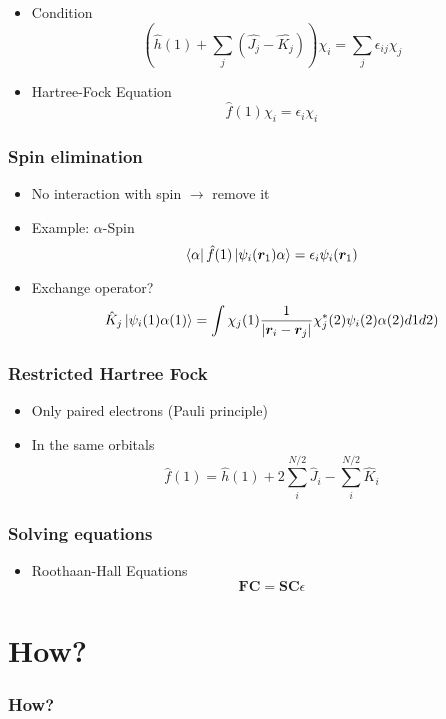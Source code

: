 \documentclass{beamer}
\begin{document}
\begin{frame}
    \begin{itemize}
        \item Condition
        \begin{equation*}
            \left(\hat{h}(1) + \sum_j(\hat{J_j} - \hat{K_j})\right)\chi_i = \sum_{j}\epsilon_{ij}\chi_j
        \end{equation*}
        \item Hartree-Fock Equation
        \begin{equation*}
            \hat{f}(1)\chi_i = \epsilon_i\chi_i
        \end{equation*}
    \end{itemize}
\end{frame}

\begin{frame}
    \frametitle{Spin elimination}
    \begin{itemize}
        \item No interaction with spin $\rightarrow$ remove it
        \item Example: $\alpha$-Spin
        \begin{equation*}
            \bra{\alpha}\hat{f}(1)\ket{\psi_i(\boldsymbol{r}_1)\alpha} = \epsilon_i\psi_i(\boldsymbol{r}_1)
        \end{equation*}
        \item Exchange operator?
        \begin{equation*}
            \hat{K}_j\ket{\psi_i(1)\alpha(1)} = \int\chi_j(1)\frac{1}{|\boldsymbol{r}_i - \boldsymbol{r}_j|}\chi_j^*(2)\psi_i(2)\alpha(2)d1d2)
        \end{equation*}
    \end{itemize}
\end{frame}

\begin{frame}
    \frametitle{Restricted Hartree Fock}
    \begin{itemize}
        \item Only paired electrons (Pauli principle)
        \item In the same orbitals
        \begin{equation*}
            \hat{f}(1) = \hat{h}(1) + 2\sum_i^{N/2}\hat{J}_i - \sum_i^{N/2}\hat{K}_i
        \end{equation*}
    \end{itemize}
\end{frame}

\begin{frame}
    \frametitle{Solving equations}
    \begin{itemize}
        \item Roothaan-Hall Equations
        \begin{equation*}
            \boldsymbol{FC} = \boldsymbol{SC}\epsilon
        \end{equation*}
    \end{itemize}
\end{frame}
\section{How?}
\label{sec:how}
\begin{frame}
    \frametitle{How?}
\end{frame}
\end{document}
